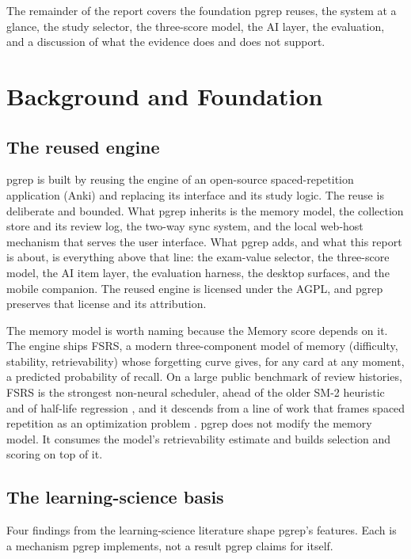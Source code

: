 \documentclass[11pt]{article}
\begin{document}
The remainder of the report covers the foundation pgrep reuses, the system at a
glance, the study selector, the three-score model, the AI layer, the evaluation, and
a discussion of what the evidence does and does not support.

\section{Background and Foundation}

\subsection{The reused engine}

pgrep is built by reusing the engine of an open-source spaced-repetition application
(Anki) and replacing its interface and its study logic. The reuse is deliberate and
bounded. What pgrep inherits is the memory model, the collection store and its review
log, the two-way sync system, and the local web-host mechanism that serves the user
interface. What pgrep adds, and what this report is about, is everything above that
line: the exam-value selector, the three-score model, the AI item layer, the
evaluation harness, the desktop surfaces, and the mobile companion. The reused engine
is licensed under the AGPL, and pgrep preserves that license and its attribution.

The memory model is worth naming because the Memory score depends on it. The engine
ships FSRS, a modern three-component model of memory (difficulty, stability,
retrievability) whose forgetting curve gives, for any card at any moment, a predicted
probability of recall. On a large public benchmark of review histories, FSRS is the
strongest non-neural scheduler, ahead of the older SM-2 heuristic and of half-life
regression \citep{settles2016}, and it descends from a line of work that frames
spaced repetition as an optimization problem \citep{tabibian2019, yesucao2022,
fsrs2024}. pgrep does not modify the memory model. It consumes the model's
retrievability estimate and builds selection and scoring on top of it.

\subsection{The learning-science basis}

Four findings from the learning-science literature shape pgrep's features. Each is a
mechanism pgrep implements, not a result pgrep claims for itself.
\end{document}
